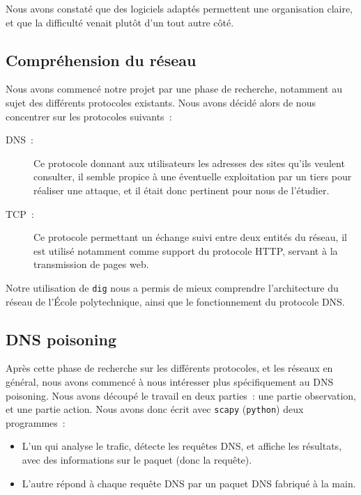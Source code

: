 \documentclass[a4paper, 12pt,twoside]{article}
\begin{document}
            Nous avons constaté que des logiciels adaptés permettent une organisation claire, et que la difficulté venait plutôt d'un tout autre côté.

        \subsection{Compréhension du réseau}

            Nous avons commencé notre projet par une phase de recherche,  notamment au sujet des différents protocoles existants. Nous avons décidé alors de nous concentrer sur les protocoles suivants~:
            \begin{description}
                \item[DNS~:] Ce protocole donnant aux utilisateurs les adresses des sites qu'ils veulent consulter, il semble propice à une éventuelle exploitation par un tiers pour réaliser une attaque, et il était donc pertinent pour nous de l'étudier.
                \item[TCP~:] Ce protocole permettant un échange suivi entre deux entités du réseau, il est utilisé notamment comme support du protocole HTTP, servant à la transmission de pages web.
            \end{description}

            Notre  utilisation de \verb!dig! nous a permis de mieux comprendre l'architecture du réseau de l'École polytechnique, ainsi que le fonctionnement du protocole DNS.

        \subsection{DNS poisoning}

            Après cette phase de recherche sur les différents protocoles, et les réseaux en général, nous avons commencé à nous intéresser plus spécifiquement au DNS poisoning. Nous avons découpé le travail en deux parties~: une partie observation, et une partie action. Nous avons donc écrit avec \verb!scapy! (\verb!python!) deux programmes~:
            \begin{itemize}[label=\color{bleu303}\textbullet{}]
                \item L'un qui analyse le trafic, détecte les requêtes DNS, et affiche les résultats, avec des informations sur le paquet (donc la requête).
                \item L'autre répond à chaque requête DNS par un paquet DNS fabriqué à la main.
            \end{itemize}
\end{document}
